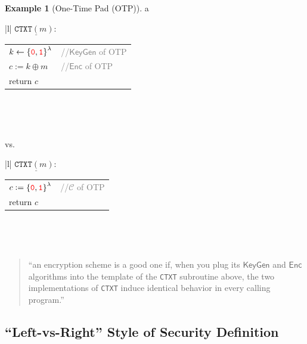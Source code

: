 \documentclass[12pt,openany]{book}
\theoremstyle{definition}
\newtheorem{example}{Example}[chapter]
\newcommand{\KeyGen}{\mathsf{KeyGen}}
\newcommand{\Enc}{\mathsf{Enc}}
\newcommand{\ciphertextspace}{\mathcal{C}}
\newcommand{\zero}{\textcolor{red}{\texttt{0}}}
\newcommand{\one}{\textcolor{red}{\texttt{1}}}
\newcommand{\tab}{\hspace{12pt}}
\newcommand{\xor}{\oplus}
\newcommand{\binaryfield}{\set{\zero,\one}}
\begin{document}
	\begin{example}[One-Time Pad (OTP)]
		a\\ \begin{center}
			\begin{minipage}{.44\textwidth}
				\begin{tabular}{|l|}
					\hline
					$\underline{\texttt{CTXT}(m):}$\\
					\begin{tabular}{ll}
						\tab$k\gets\binaryfield^\lambda$ & \textcolor{gray}{//\(\KeyGen\) of OTP}\\
						\tab$c:=k\xor m$ & \textcolor{gray}{//\(\Enc\) of OTP}\\
						\tab return $c$\\
					\end{tabular}\\
					\hline
				\end{tabular}\\
			\end{minipage} vs.
		\begin{minipage}{.3\textwidth}
			\begin{tabular}{|l|}
				\hline
				$\underline{\texttt{CTXT}(m):}$\\
				\begin{tabular}{ll}
					\tab$c:=\binaryfield^\lambda$ & \textcolor{gray}{//\(\ciphertextspace\) of OTP}\\
					\tab return $c$\\
				\end{tabular}\\
				\hline
			\end{tabular}\\
		\end{minipage}
		\end{center}
	\end{example}

	\begin{quote}
		``an encryption scheme is a good one if, when you plug its \(\KeyGen\) and \(\Enc\) algorithms into the template of the \texttt{CTXT} subroutine above, the two implementations of \texttt{CTXT} induce identical behavior in every calling program.''
	\end{quote}

	\subsection{``Left-vs-Right'' Style of Security Definition}
	
\end{document}
